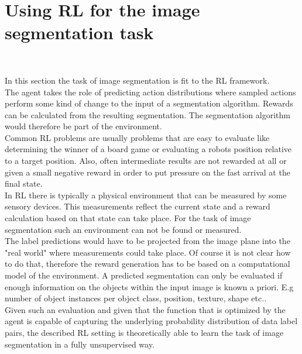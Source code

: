 \section{Using RL for the image segmentation task}~\label{sec:rl_for_seg}

In this section the task of image segmentation is fit to the RL framework.\\
The agent takes the role of predicting action distributions where sampled actions perform some kind of change to the input of a segmentation algorithm. Rewards can be calculated from the resulting segmentation. The segmentation algorithm would therefore be part of the environment.\\
Common RL problems are usually problems that are easy to evaluate like determining the winner of a board game or evaluating a robots position relative to a target position. Also, often intermediate results are not rewarded at all or given a small negative reward in order to put pressure on the fast arrival at the final state.\\
In RL there is typically a physical environment that can be measured by some sensory devices. This measurements reflect the current state and a reward calculation based on that state can take place. For the task of image segmentation such an environment can not be found or measured.\\
The label predictions would have to be projected from the image plane into the "real world" where measurements could take place. Of course it is not clear how to do that, therefore the reward generation has to be based on a computational model of the environment. A predicted segmentation can only be evaluated if enough information on the objects within the input image is known a priori. E.g number of object instances per object class, position, texture, shape etc..\\
Given such an evaluation and given that the function that is optimized by the agent is capable of capturing the underlying probability distribution of data label pairs, the described RL setting is theoretically able to learn the task of image segmentation in a fully unsupervised way.\\

